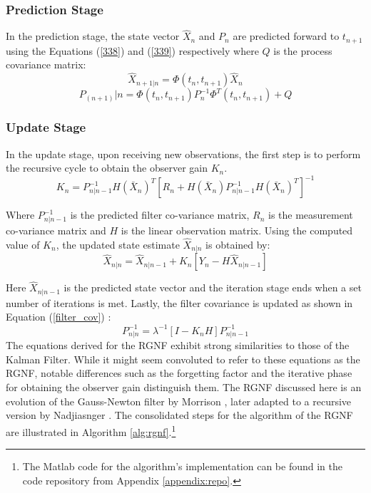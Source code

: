 \subsubsection{Prediction Stage}
In the prediction stage, the state vector \(\hat{X}_n\) and \(P_n\) are  predicted forward to \(t_{n+1}\) using the Equations (\ref{338}) and (\ref{339}) respectively where \(Q\) is the process covariance matrix:
\begin{equation}
        \hat{X}_{n+1|n} = \Phi(t_n,t_{n+1})\hat{X}_n
        \label{338}
\end{equation}
\begin{equation}
    P_{(n+1)}|n = \Phi(t_n,t_{n+1})P^{-1}_n \Phi^T(t_n,t_{n+1}) +Q 
    \label{339}
\end{equation}

\subsubsection{Update Stage}
In the update stage, upon receiving new observations, the first step is to perform the recursive cycle to obtain the observer gain \(K_n\).
\begin{equation}
    K_n = P^{-1}_{n|n-1} H(\bar{X}_n)^T [R_n + H(\bar{X}_n) P^{-1}_{n|n-1} H(\bar{X}_n)^T]^{-1}
    \label{337update}
\end{equation}

Where \(P^{-1}_{n|n-1}\) is the predicted filter co-variance matrix, \(R_n\) is the measurement co-variance matrix and \(H\) is the linear observation matrix. Using the computed value of \(K_n\), the updated state estimate \(\hat{X}_{n|n}\) is obtained by:
\begin{equation}
    \hat{X}_{n|n} = \hat{X}_{n|n-1} + K_n[Y_n-H\hat{X}_{n|n-1}]
\end{equation}

Here \(\hat{X}_{n|n-1}\) is the predicted state vector and the iteration stage ends when a set number of iterations is met. Lastly, the filter covariance is updated as shown in Equation (\ref{filter_cov}) : 
\begin{equation}
    P^{-1}_{n|n}= \lambda^{-1}[I-K_nH]P^{-1}_{n|n-1}
    \label{filter_cov}
\end{equation}
The equations derived for the \ac{RGNF} exhibit strong similarities to those of the Kalman Filter. While it might seem convoluted to refer to these equations as the \ac{RGNF}, notable differences such as the forgetting factor and the iterative phase for obtaining the observer gain distinguish them. The \ac{RGNF} discussed here is an evolution of the Gauss-Newton filter by Morrison \cite{Morrison}, later adapted to a recursive version by Nadjiasnger \cite{improvedGauss}. The consolidated steps for the algorithm of the \ac{RGNF} are illustrated in Algorithm \ref{alg:rgnf}.\footnote{The Matlab code for the algorithm's implementation can be found in the code repository from Appendix \ref{appendix:repo}.}

